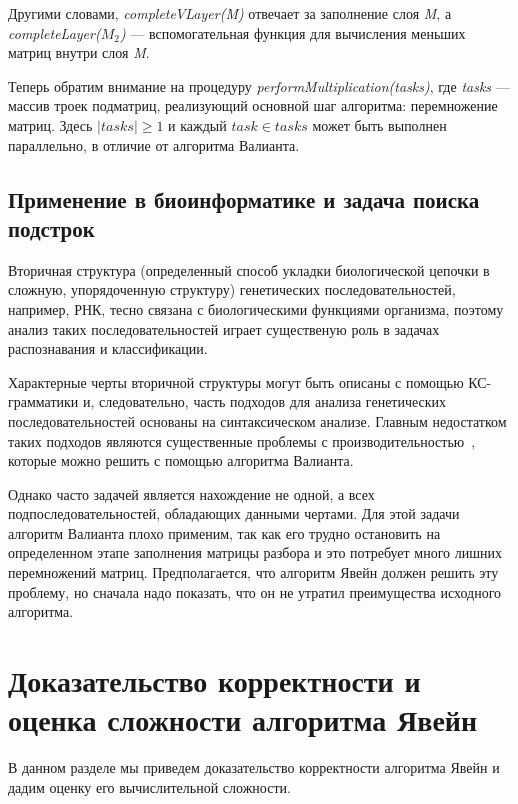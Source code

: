 Другими словами, \textit{completeVLayer(M)} отвечает за заполнение слоя \textit{M}, а \textit{completeLayer($M_{2}$)} --- вспомогательная функция для вычисления меньших матриц внутри слоя \textit{M}.

Теперь обратим внимание на процедуру \textit{performMultiplication(tasks)}, где \textit{tasks} --- массив троек подматриц, реализующий основной шаг алгоритма: перемножение матриц.
Здесь $|tasks| \ge 1$ и каждый $task \in tasks$ может быть выполнен параллельно, в отличие от алгоритма Валианта.

\subsection{Применение в биоинформатике и задача поиска подстрок}

Вторичная структура (определенный способ укладки биологической цепочки в сложную, упорядоченную структуру) генетических последовательностей, например, РНК, тесно связана с биологическими функциями организма, поэтому анализ таких последовательностей играет существеную роль в задачах распознавания и классификации.

Характерные черты вторичной структуры могут быть описаны с помощью КС-грамматики и, следовательно, часть подходов для анализа генетических последовательностей основаны на синтаксическом анализе. Главным недостатком таких подходов являются существенные проблемы с производительностью~\cite{durbin1996biological}, которые можно решить с помощью алгоритма Валианта.

Однако часто задачей является нахождение не одной, а всех подпоследовательностей, обладающих данными чертами. Для этой задачи алгоритм Валианта плохо применим,  так как его трудно остановить на определенном этапе заполнения матрицы разбора и это потребует много лишних перемножений матриц.
Предполагается, что алгоритм Явейн должен решить эту проблему, но сначала надо показать, что он не утратил преимущества исходного алгоритма.

\section{Доказательство корректности и оценка сложности алгоритма Явейн}

В данном разделе мы приведем доказательство корректности алгоритма Явейн и дадим оценку его вычислительной сложности.

